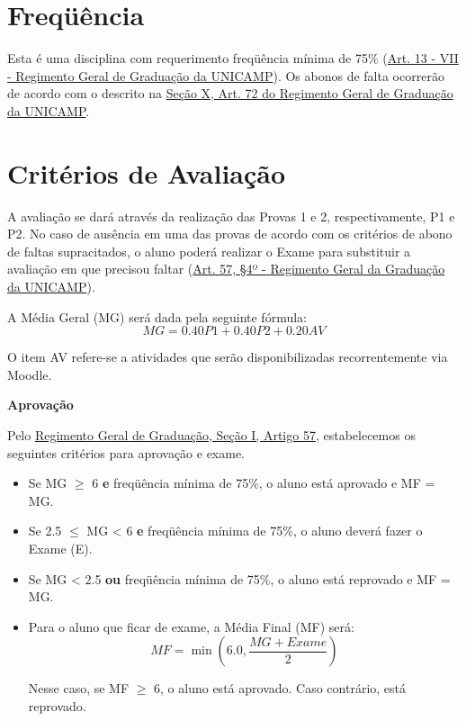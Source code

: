 \documentclass[paper=letter, fontsize=12pt]{scrartcl} %
\begin{document}
\section{Freqüência}

Esta é uma disciplina com requerimento freqüência mínima de 75\% (\href{https://www.dac.unicamp.br/portal/graduacao/regimento-geral}{Art. 13 - VII - Regimento Geral de Graduação da UNICAMP}). Os abonos de falta ocorrerão de acordo com o descrito na \href{https://www.dac.unicamp.br/portal/graduacao/regimento-geral}{Seção X, Art. 72 do Regimento Geral de Graduação da UNICAMP}.

\section{Critérios de Avaliação}

A avaliação se dará através da realização das Provas 1 e 2, respectivamente, P1 e P2. No caso de ausência em uma das provas de acordo com os critérios de abono de faltas supracitados, o aluno poderá realizar o Exame para substituir a avaliação em que precisou faltar (\href{https://www.dac.unicamp.br/portal/graduacao/regimento-geral}{Art. 57, §4º - Regimento Geral da Graduação da UNICAMP}).

\vspace{10pt}

A Média Geral (MG) será dada pela seguinte fórmula:
\[MG = 0.40 P1 + 0.40 P2 + 0.20 AV\]

O item AV refere-se a atividades que serão disponibilizadas recorrentemente via Moodle.

\textbf{Aprovação}

Pelo \href{https://www.dac.unicamp.br/portal/graduacao/regimento-geral}{{\color{blue} Regimento Geral de Graduação, Seção I, Artigo 57}}, estabelecemos os seguintes critérios para aprovação e exame.

\begin{itemize}
\item Se MG $\geq$ 6 \textbf{e} freqüência mínima de 75\%, o aluno está aprovado e MF = MG.

\item Se 2.5 $\leq$ MG < 6 \textbf{e} freqüência mínima de 75\%, o aluno deverá fazer o Exame (E).

\item Se MG < 2.5 \textbf{ou} freqüência mínima de 75\%, o aluno está reprovado e MF = MG.

\item Para o aluno que ficar de exame, a Média Final (MF) será:
$$MF = \min\left(6.0, \frac{MG + Exame}{2}\right)$$

Nesse caso, se MF $\geq$ 6, o aluno está aprovado. Caso contrário, está reprovado.


\end{itemize}
\end{document}
